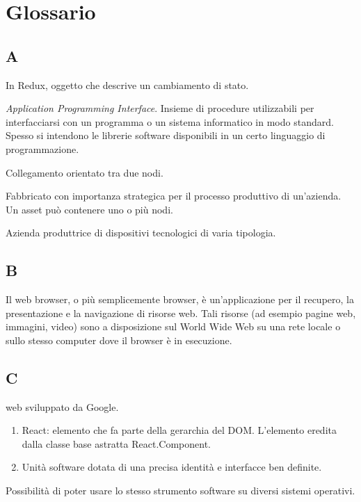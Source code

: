 \section{Glossario}
	\subsection{A}
	
		In Redux, oggetto che descrive un cambiamento di stato.
		
		\textit{Application Programming Interface}. Insieme di procedure utilizzabili per interfacciarsi con un programma o un sistema informatico in modo standard. Spesso si intendono le librerie software disponibili in un certo linguaggio di programmazione.
	
		Collegamento orientato tra due nodi.
		
		Fabbricato con importanza strategica per il processo produttivo di un'azienda. Un asset può contenere uno o più nodi.
		
		Azienda produttrice di dispositivi tecnologici di varia tipologia.
		
	\subsection{B}

		Il web browser, o più semplicemente browser, è un'applicazione per il recupero, la presentazione e la navigazione di risorse web. Tali risorse (ad esempio pagine web, immagini, video) sono a disposizione sul World Wide Web su una rete locale o sullo stesso computer dove il browser è in esecuzione.
		
	\subsection{C}
		 web sviluppato da Google.
		
		\begin{enumerate}
			\item React: elemento che fa parte della gerarchia del DOM. L'elemento eredita dalla classe base astratta React.Component.
			\item Unità software dotata di una precisa identità e interfacce ben definite.
		\end{enumerate}
		
		Possibilità di poter usare lo stesso strumento software su diversi sistemi operativi.
		
